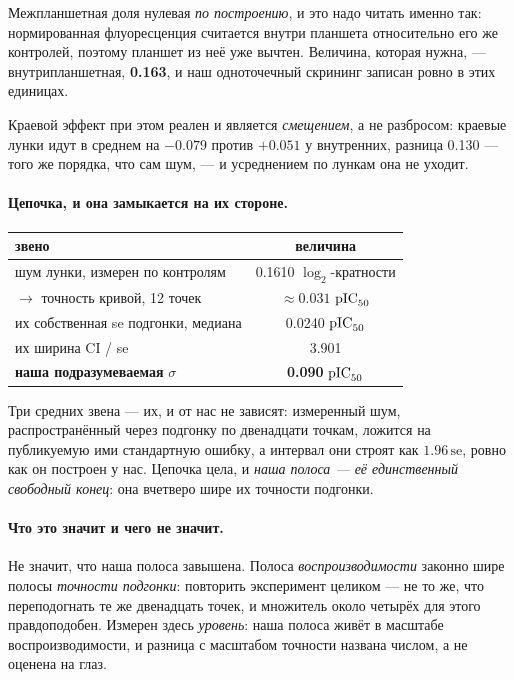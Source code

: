 Межпланшетная доля нулевая \emph{по построению}, и это надо читать именно так: нормированная
флуоресценция считается внутри планшета относительно его же контролей, поэтому планшет из неё уже
вычтен. Величина, которая нужна, --- внутрипланшетная, \textbf{0.163}, и наш одноточечный скрининг
записан ровно в этих единицах.

Краевой эффект при этом реален и является \emph{смещением}, а не разбросом: краевые лунки идут в
среднем на $-0.079$ против $+0.051$ у внутренних, разница 0.130 --- того же порядка, что сам шум, ---
и усреднением по лункам она не уходит.

\paragraph{Цепочка, и она замыкается на их стороне.}

\begin{center}
\begin{tabular}{lc}
\toprule
звено & величина \\
\midrule
шум лунки, измерен по контролям            & 0.1610 $\log_2$-кратности \\
$\rightarrow$ точность кривой, 12 точек     & $\approx 0.031$ $\mathrm{pIC}_{50}$ \\
их собственная se подгонки, медиана        & 0.0240 $\mathrm{pIC}_{50}$ \\
их ширина CI / se                          & 3.901 \\
\midrule
\textbf{наша подразумеваемая} $\sigma$      & \textbf{0.090} $\mathrm{pIC}_{50}$ \\
\bottomrule
\end{tabular}
\end{center}

Три средних звена --- их, и от нас не зависят: измеренный шум, распространённый через подгонку по
двенадцати точкам, ложится на публикуемую ими стандартную ошибку, а интервал они строят как
$1.96\,\mathrm{se}$, ровно как он построен у нас. Цепочка цела, и \emph{наша полоса --- её
единственный свободный конец}: она вчетверо шире их точности подгонки.

\paragraph{Что это значит и чего не значит.} Не значит, что наша полоса завышена. Полоса
\emph{воспроизводимости} законно шире полосы \emph{точности подгонки}: повторить эксперимент
целиком --- не то же, что переподогнать те же двенадцать точек, и множитель около четырёх для этого
правдоподобен. Измерен здесь \emph{уровень}: наша полоса живёт в масштабе воспроизводимости, и
разница с масштабом точности названа числом, а не оценена на глаз.

